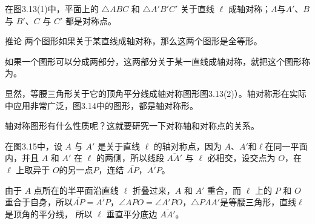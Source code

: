 在图3.13(1)中，平面上的 $\triangle ABC$ 和 $\triangle A'B'C'$ 关于直线 $\ell$ 成轴对称；$A$与$A'$、$B$ 与 $B'$、$C$ 与 $C'$ 都是对称点。

\begin{figure}
    \caption{}\label{fig:3-13}
\end{figure}

\begin{Deduction}{推论}
两个图形如果关于某直线成轴对称，那么这两个图形是全等形。
\end{Deduction}

\begin{Definition}
如果一个图形可以分成两部分，这两部分关于某一直线成轴对称，就把这个图形称为。
\end{Definition}

显然，等腰三角形关于它的顶角平分线成轴对称图形图3.13(2)）。轴对称形在实际中应用非常广泛，图3.14中的图形，都是轴对称形。
\begin{figure}
    \caption{}\label{fig:3-14}
\end{figure}

轴对称图形有什么性质呢？这就要研究一下对称轴和对称点的关系。

在图3.15中，设 $A$ 与 $A'$ 是关于直线 $\ell$ 的轴对称点，因为 $A$、$A'$和$\ell$在同一平面内，并且 $A$ 和 $A'$ 在 $\ell$ 的两侧，所以线段 $\overline{AA'}$ 与 $\ell$ 必相交，设交点为 $O$，在 $\ell$ 上取异于 $O$的另一点$P$，连结 $\overline{AP}$，$\overline{A'P}$。

由于 $A$ 点所在的半平面沿直线 $\ell$ 折叠过来，$A$ 和 $A'$ 重合，而 $\ell$ 上的 $P$ 和 $O$ 重合于自身，所以$\overline{AP}=\overline{A'P}$，$\angle APO=\angle A'PO$，$\triangle PAA'$是等腰三角形，直线$\ell$是顶角的平分线，
所以 $\ell$ 垂直平分底边 $\overline{AA'}$。

